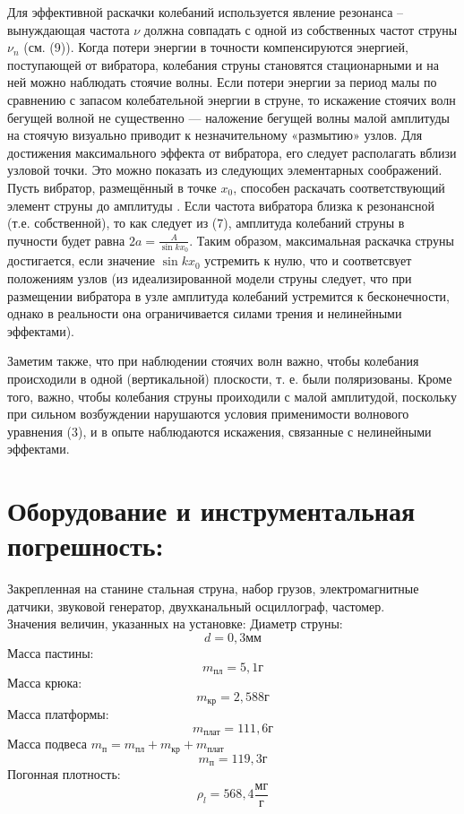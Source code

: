 \documentclass[a4paper,12pt]{article} %
\begin{document}
Для эффективной раскачки колебаний используется явление резонанса -- вынуждающая частота $\nu$ должна совпадать с одной из собственных частот струны $\nu_n$ (см. (9)). Когда потери энергии в точности компенсируются энергией, поступающей от вибратора, колебания струны становятся стационарными и на ней можно наблюдать стоячие волны. Если потери энергии за период малы по сравнению с запасом колебательной энергии в струне, то искажение стоячих волн бегущей волной не существенно — наложение бегущей волны малой амплитуды на стоячую визуально приводит к незначительному «размытию» узлов. Для достижения максимального эффекта от вибратора, его следует располагать вблизи узловой точки. Это можно показать из следующих элементарных соображений. Пусть вибратор, размещённый в точке $x_0$, способен раскачать соответствующий элемент струны до амплитуды . Если частота вибратора близка к резонансной (т.е. собственной), то как следует из (7), амплитуда колебаний струны в пучности будет равна $2a = \frac{A}{\sin kx_0}$. Таким образом, максимальная раскачка струны достигается, если значение $\sin kx_0$ устремить к нулю, что и соответсвует положениям узлов (из идеализированной модели струны следует, что при размещении вибратора в узле амплитуда колебаний устремится к бесконечности, однако в реальности она ограничивается силами трения и нелинейными эффектами).

Заметим также, что при наблюдении стоячих волн важно, чтобы колебания происходили в одной (вертикальной) плоскости, т. е. были поляризованы. Кроме того, важно, чтобы колебания струны проиходили с малой амплитудой, поскольку при сильном возбуждении нарушаются условия применимости волнового уравнения (3), и в опыте наблюдаются искажения, связанные с нелинейными эффектами.
\section{Оборудование и инструментальная погрешность:} Закрепленная на станине стальная струна, набор грузов, электромагнитные датчики, звуковой генератор, двухканальный осциллограф, частомер.\\
Значения величин, указанных на установке:
Диаметр струны:\\
\[d = 0,3\text{мм}\]
Масса пастины:
\[m_\text{пл} = 5,1\text{г}\]
Масса  крюка:
\[m_\text{кр} = 2,588\text{г}\]
Масса платформы:
\[m_{\text{плат}}=111,6\text{г}\]
Масса подвеса $m_\text{п}=m_\text{пл}+m_\text{кр}+m_{\text{плат}}$
\[m_\text{п}=	119,3\text{г}\]
Погонная плотность:
\[\rho_l = 568,4\frac{\text{мг}}{\text{г}}\]
\end{document}
